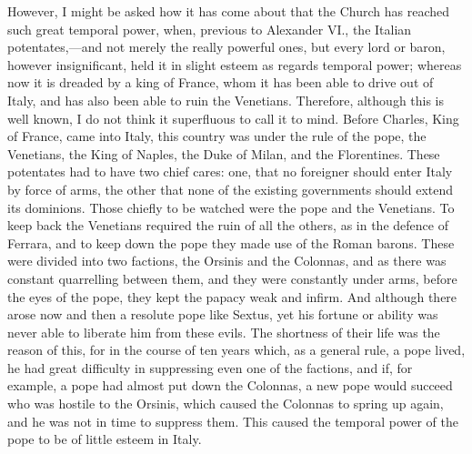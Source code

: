 \documentclass[12pt,letterpaper]{memoir}
\begin{document}
However, I might be asked how it has come about that the Church has
reached such great temporal power, when, previous to Alexander VI.,
the Italian potentates,---and not merely the really powerful ones, but
every lord or baron, however insignificant, held it in slight esteem
as regards temporal power; whereas now it is dreaded by a king of
France, whom it has been able to drive out of Italy, and has also been
able to ruin the Venetians. Therefore, although this is well known, I
do not think it superfluous to call it to mind. Before Charles, King
of France, came into Italy, this country was under the rule of the
pope, the Venetians, the King of Naples, the Duke of Milan, and the
Florentines. These potentates had to have two chief cares: one, that no
foreigner should enter Italy by force of arms, the other that none of
the existing governments should extend its dominions. Those chiefly to
be watched were the pope and the Venetians. To keep back the Venetians
required the ruin of all the others, as in the defence of Ferrara,
and to keep down the pope they made use of the Roman barons. These
were divided into two factions, the Orsinis and the Colonnas, and as
there was constant quarrelling between them, and they were constantly
under arms, before the eyes of the pope, they kept the papacy weak and
infirm. And although there arose now and then a resolute pope like
Sextus, yet his fortune or ability was never able to liberate him from
these evils. The shortness of their life was the reason of this, for
in the course of ten years which, as a general rule, a pope lived, he
had great difficulty in suppressing even one of the factions, and if,
for example, a pope had almost put down the Colonnas, a new pope would
succeed who was hostile to the Orsinis, which caused the Colonnas to
spring up again, and he was not in time to suppress them. This caused
the temporal power of the pope to be of little esteem in Italy.
\end{document}

